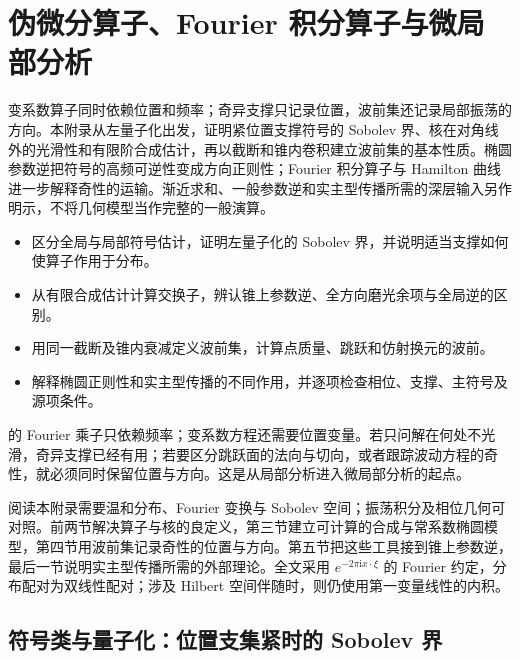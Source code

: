 \chapter{伪微分算子、Fourier 积分算子与微局部分析}
\label{b2:app:G}

\begin{chapterabstract}
变系数算子同时依赖位置和频率；奇异支撑只记录位置，波前集还记录局部振荡的方向。本附录从左量子化出发，证明紧位置支撑符号的 Sobolev 界、核在对角线外的光滑性和有限阶合成估计，再以截断和锥内卷积建立波前集的基本性质。椭圆参数逆把符号的高频可逆性变成方向正则性；Fourier 积分算子与 Hamilton 曲线进一步解释奇性的运输。渐近求和、一般参数逆和实主型传播所需的深层输入另作明示，不将几何模型当作完整的一般演算。
\end{chapterabstract}

\begin{learninggoals}
\begin{itemize}
\item\label{b2:item:app-G-goal-1}区分全局与局部符号估计，证明左量子化的 Sobolev 界，并说明适当支撑如何使算子作用于分布。
\item\label{b2:item:app-G-goal-2}从有限合成估计计算交换子，辨认锥上参数逆、全方向磨光余项与全局逆的区别。
\item\label{b2:item:app-G-goal-3}用同一截断及锥内衰减定义波前集，计算点质量、跳跃和仿射换元的波前。
\item\label{b2:item:app-G-goal-4}解释椭圆正则性和实主型传播的不同作用，并逐项检查相位、支撑、主符号及源项条件。
\end{itemize}
\end{learninggoals}

的 Fourier 乘子只依赖频率；变系数方程还需要位置变量。若只问解在何处不光滑，奇异支撑已经有用；若要区分跳跃面的法向与切向，或者跟踪波动方程的奇性，就必须同时保留位置与方向。这是从局部分析进入微局部分析的起点。

\ProseParagraphBreak
阅读本附录需要温和分布、Fourier 变换与 Sobolev 空间；振荡积分及相位几何可对照。前两节解决算子与核的良定义，第三节建立可计算的合成与常系数椭圆模型，第四节用波前集记录奇性的位置与方向。第五节把这些工具接到锥上参数逆，最后一节说明实主型传播所需的外部理论。全文采用 \(e^{-2\pi\mathrm ix\cdot\xi}\) 的 Fourier 约定，分布配对为双线性配对；涉及 Hilbert 空间伴随时，则仍使用第一变量线性的内积。

\section{符号类与量子化：位置支集紧时的 Sobolev 界}
\label{b2:sec:app-G-1}

